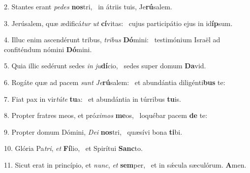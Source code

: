 2. Stantes erant \textit{pe}\textit{des} \textbf{nos}tri, \ast\  in átriis tuis, Je\textbf{rú}salem.\

3. Jerúsalem, quæ ædificá\textit{tur} \textit{ut} \textbf{cí}vitas: \ast\  cujus participátio ejus in id\textbf{íp}sum.\

4. Illuc enim ascendérunt tribus, \textit{tri}\textit{bus} \textbf{Dó}mini: \ast\  testimónium Israël ad confiténdum nómini \textbf{Dó}mini.\

5. Quia illic sedérunt sedes \textit{in} \textit{ju}\textbf{dí}cio, \ast\  sedes super domum \textbf{Da}vid.\

6. Rogáte quæ ad pacem \textit{sunt} \textit{Je}\textbf{rú}salem: \ast\  et abundántia diligénti\textbf{bus} te:\

7. Fiat pax in vir\textit{tú}\textit{te} \textbf{tu}a: \ast\  et abundántia in túrribus \textbf{tu}is.\

8. Propter fratres meos, et pró\textit{xi}\textit{mos} \textbf{me}os, \ast\  loquébar pacem \textbf{de} te:\

9. Propter domum Dómini, \textit{De}\textit{i} \textbf{nos}tri, \ast\  quæsívi bona \textbf{ti}bi.\

10. Glória Pa\textit{tri}, \textit{et} \textbf{Fí}lio, \ast\  et Spirítui \textbf{Sanc}to.\

11. Sicut erat in princípio, et \textit{nunc}, \textit{et} \textbf{sem}per, \ast\  et in sǽcula sæculórum. \textbf{A}men.\


